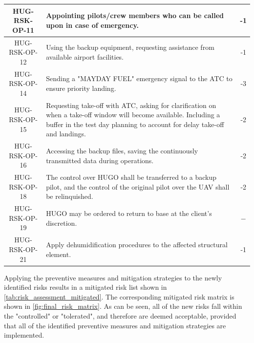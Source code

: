 \begin{longtable}{|c|p{12cm}|c|}
HUG-RSK-OP-11 &
Appointing pilots/crew members who can be called upon in case of emergency.
& -1 \\ \hline

HUG-RSK-OP-12 &
Using the backup equipment, requesting assistance from available airport facilities.
& -1 \\ \hline

HUG-RSK-OP-14 &
Sending a "MAYDAY FUEL" emergency signal to the ATC to ensure priority landing.
& -3 \\ \hline

HUG-RSK-OP-15 &
Requesting take-off with ATC, asking for clarification on when a take-off window will become available. Including a buffer in the test day planning to account for delay take-off and landings.
& -2 \\ \hline

HUG-RSK-OP-16 &
Accessing the backup files, saving the continuously transmitted data during operations.
& -2 \\\hline

HUG-RSK-OP-18 & The control over HUGO shall be transferred to a backup pilot, and the control of the original pilot over the UAV shall be relinquished. & -2 \\\hline

HUG-RSK-OP-19 & HUGO may be ordered to return to base at the client's discretion. & $-$ \\\hline

HUG-RSK-OP-21 & Apply dehumidification procedures to the affected structural element. & -1 \\


\end{longtable}

Applying the preventive measures and mitigation strategies to the newly identified risks results in a mitigated risk list shown in \autoref{tab:risk_assessment_mitigated}. The corresponding mitigated risk matrix is shown in \autoref{fig:final_risk_matrix}. As can be seen, all of the new risks fall within the "controlled" or "tolerated", and therefore are deemed acceptable, provided that all of the identified preventive measures and mitigation strategies are implemented.




